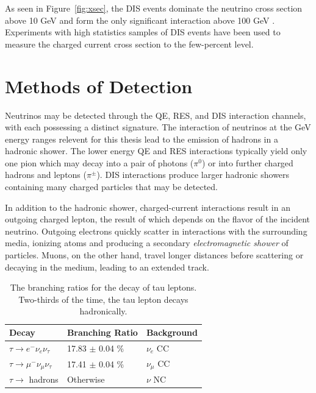 As seen in Figure~\ref{fig:xsec}, the DIS events dominate the neutrino cross section above 10 GeV and form the only significant interaction above 100 GeV \cite{formaggion-xsec}. 
Experiments with high statistics samples of DIS events have been used to measure the charged current cross section to the few-percent level.


\label{sec:detection_methods}
\section{Methods of Detection}
Neutrinos may be detected through the QE, RES, and DIS interaction channels, with each possessing a distinct signature.
The interaction of neutrinos at the GeV energy ranges relevent for this thesis lead to the emission of hadrons in a hadronic shower.
The lower energy QE and RES interactions typically yield only one pion which may decay into a pair of photons ($\pi^0$) or into further charged hadrons and leptons ($\pi^\pm$).
DIS interactions produce larger hadronic showers containing many charged particles that may be detected.

In addition to the hadronic shower, charged-current interactions result in an outgoing charged lepton, the result of which depends on the flavor of the incident neutrino.
Outgoing electrons quickly scatter in interactions with the surrounding media, ionizing atoms and producing a secondary \emph{electromagnetic shower} of particles.
Muons, on the other hand, travel longer distances before scattering or decaying in the medium, leading to an extended track.

\begin{table}[]
\centering
\begin{tabular}{@{}lll@{}}
\toprule
Decay                                     & Branching Ratio     & Background   \\ \midrule
$\tau \rightarrow e^- \nu_e \nu_\tau$     & 17.83 $\pm$ 0.04 \% & $\nu_e$ CC   \\
$\tau \rightarrow \mu^- \nu_\mu \nu_\tau$ & 17.41 $\pm$ 0.04 \% & $\nu_\mu$ CC \\
$\tau \rightarrow$ hadrons                & Otherwise           & $\nu$ NC     \\ \bottomrule
\end{tabular}
\caption{The branching ratios for the decay of tau leptons. Two-thirds of the time, the tau lepton decays hadronically.}
\label{tab:tau_decays}
\end{table}


